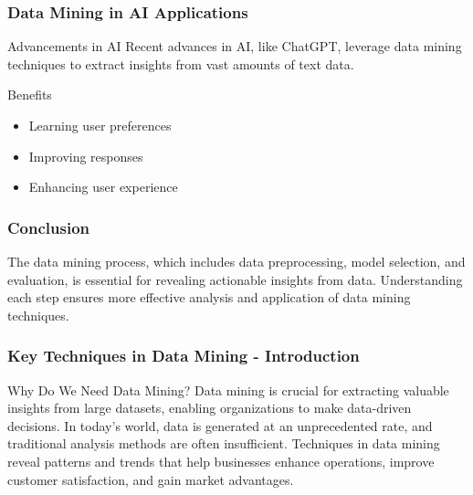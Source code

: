 \documentclass[aspectratio=169]{beamer}
\begin{document}
\begin{frame}[fragile]
    \frametitle{Data Mining in AI Applications}
    \begin{block}{Advancements in AI}
        Recent advances in AI, like ChatGPT, leverage data mining techniques to extract insights from vast amounts of text data.
    \end{block}
    \begin{block}{Benefits}
        \begin{itemize}
            \item Learning user preferences
            \item Improving responses
            \item Enhancing user experience
        \end{itemize}
    \end{block}
\end{frame}

\begin{frame}[fragile]
    \frametitle{Conclusion}
    The data mining process, which includes data preprocessing, model selection, and evaluation, is essential for revealing actionable insights from data. Understanding each step ensures more effective analysis and application of data mining techniques.
\end{frame}

\begin{frame}[fragile]
    \frametitle{Key Techniques in Data Mining - Introduction}
    \begin{block}{Why Do We Need Data Mining?}
        Data mining is crucial for extracting valuable insights from large datasets, enabling organizations to make data-driven decisions. 
        In today's world, data is generated at an unprecedented rate, and traditional analysis methods are often insufficient. 
        Techniques in data mining reveal patterns and trends that help businesses enhance operations, improve customer satisfaction, and gain market advantages.
    \end{block}
\end{frame}
\end{document}
